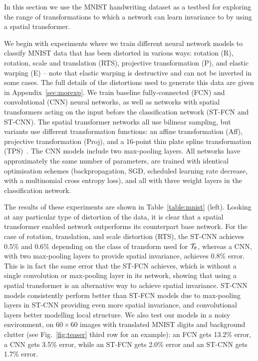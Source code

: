 \documentclass{article} %
\newcommand{\figref}[1]{Fig.~\ref{#1}}
\newcommand{\tblref}[1]{Table~\ref{#1}}
\begin{document}
In this section we use the MNIST handwriting dataset as a
testbed for exploring the range of transformations to which a network can learn invariance to by using a spatial transformer.

We begin with experiments where we train different neural network models to classify
MNIST data that has been distorted in various ways: rotation (R),
rotation, scale and translation (RTS),
projective transformation (P),
and elastic warping (E) -- note that elastic warping is destructive and can not be inverted in some cases. 
The full details of the distortions used to generate this data are given in Appendix~\ref{sec:morexp}.
We train baseline fully-connected (FCN) and convolutional (CNN) neural networks,
as well as networks with spatial transformers acting on the input before the
classification network (ST-FCN and ST-CNN). The spatial transformer networks all
use bilinear sampling, but variants use different transformation functions: an
affine transformation (Aff), projective transformation (Proj), and a 16-point
thin plate spline transformation (TPS)~\cite{Bookstein89}. The CNN models include two max-pooling layers. All networks have approximately the same
number of parameters, are trained with identical optimisation schemes
(backpropagation, SGD, scheduled learning rate decrease, with a multinomial
cross entropy loss), and all with three weight layers in the
classification network.


The results of these experiments are shown in \tblref{table:mnist} (left).
Looking at any particular type of distortion of the data, it is clear that a
spatial transformer enabled network outperforms its counterpart base network.
For the case of rotation, translation, and scale distortion (RTS), the ST-CNN
achieves 0.5\% and 0.6\% depending on the class of transform used for ${\cal
T}_\theta$, whereas a CNN, with two max-pooling layers to provide spatial
invariance, achieves 0.8\% error. This is in fact the same error that the ST-FCN
achieves, which is without a single convolution or max-pooling layer in its
network, showing that using a spatial transformer is an alternative way to achieve spatial invariance. ST-CNN models consistently perform better than ST-FCN models due to max-pooling 
layers in ST-CNN providing even more spatial invariance, and convolutional layers better modelling local structure. We also test our models in a noisy environment, on $60 \times 60$ images with translated MNIST digits and background clutter (see \figref{fig:teaser} third row for an example): an FCN gets 13.2\% error, a CNN gets 3.5\% error, while an ST-FCN gets 2.0\% error and an ST-CNN gets 1.7\% error.
\end{document}
